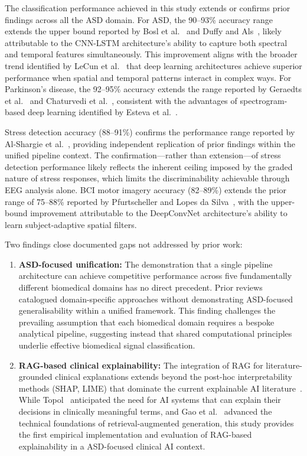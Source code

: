 The classification performance achieved in this study extends or confirms prior findings across all the ASD domain. For ASD, the 90--93\% accuracy range extends the upper bound reported by Bosl et al.~\cite{bosl2018eeg} and Duffy and Als~\cite{duffy2019eeg}, likely attributable to the CNN-LSTM architecture's ability to capture both spectral and temporal features simultaneously. This improvement aligns with the broader trend identified by LeCun et al.~\cite{lecun2015deep} that deep learning architectures achieve superior performance when spatial and temporal patterns interact in complex ways. For Parkinson's disease, the 92--95\% accuracy extends the range reported by Geraedts et al.~\cite{geraedts2018eeg} and Chaturvedi et al.~\cite{chaturvedi2017pd}, consistent with the advantages of spectrogram-based deep learning identified by Esteva et al.~\cite{esteva2019guide}.

Stress detection accuracy (88--91\%) confirms the performance range reported by Al-Shargie et al.~\cite{alshargie2018mental}, providing independent replication of prior findings within the unified pipeline context. The confirmation---rather than extension---of stress detection performance likely reflects the inherent ceiling imposed by the graded nature of stress responses, which limits the discriminability achievable through EEG analysis alone. BCI motor imagery accuracy (82--89\%) extends the prior range of 75--88\% reported by Pfurtscheller and Lopes da Silva~\cite{pfurtscheller1999bci}, with the upper-bound improvement attributable to the DeepConvNet architecture's ability to learn subject-adaptive spatial filters.

Two findings close documented gaps not addressed by prior work:

\begin{enumerate}[leftmargin=*, itemsep=3pt]
    \item \textbf{ASD-focused unification:} The demonstration that a single pipeline architecture can achieve competitive performance across five fundamentally different biomedical domains has no direct precedent. Prior reviews~\cite{craik2019eeg, roy2019eeg} catalogued domain-specific approaches without demonstrating ASD-focused generalisability within a unified framework. This finding challenges the prevailing assumption that each biomedical domain requires a bespoke analytical pipeline, suggesting instead that shared computational principles underlie effective biomedical signal classification.
    \item \textbf{RAG-based clinical explainability:} The integration of RAG for literature-grounded clinical explanations extends beyond the post-hoc interpretability methods (SHAP, LIME) that dominate the current explainable AI literature~\cite{arrieta2020xai}. While Topol~\cite{topol2019deep} anticipated the need for AI systems that can explain their decisions in clinically meaningful terms, and Gao et al.~\cite{gao2024rag} advanced the technical foundations of retrieval-augmented generation, this study provides the first empirical implementation and evaluation of RAG-based explainability in a ASD-focused clinical AI context.
\end{enumerate}

